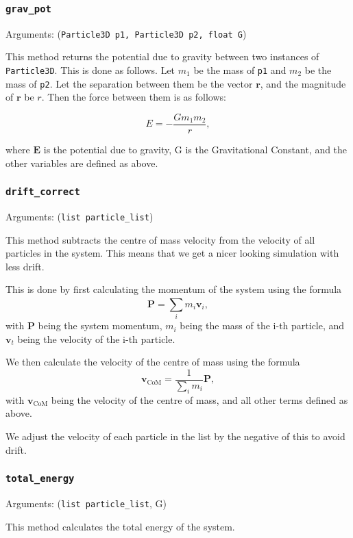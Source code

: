 \documentclass[a4paper, 11pt, british, left=1in, right=1in, top=0.3in, bottom=1in]{article}
\begin{document}
	\subsubsection{\texttt{grav\_pot}}
	
	Arguments: (\texttt{Particle3D p1, Particle3D p2, float G})
	
	This method returns the potential due to gravity between two instances of \texttt{Particle3D}. This is done as follows. Let $m_1$ be the mass of \texttt{p1} and $m_2$ be the mass of \texttt{p2}. Let the separation between them be the vector $\textbf{r}$, and the magnitude of $\textbf{r}$ be $r$. Then the force between them is as follows:
	
	$$E = -\frac{Gm_1m_2}{r},$$
	
	where $\textbf{E}$ is the potential due to gravity, G is the Gravitational Constant, and the other variables are defined as above. 
	
	\subsubsection{\texttt{drift\_correct}}
	
	Arguments: (\texttt{list particle\_list})
	
	This method subtracts the centre of mass velocity from the velocity of all particles in the system. This means that we get a nicer looking simulation with less drift. 
	
	This is done by first calculating the momentum of the system using the formula $$\textbf{P} = \sum_{i}^{}m_i\textbf{v}_i, $$ with $\textbf{P}$ being the system momentum, $m_i$ being the mass of the i-th particle, and $\textbf{v}_t$ being the velocity of the i-th particle. 
	
	We then calculate the velocity of the centre of mass using the formula $$\textbf{v}_{\text{CoM}} = \frac{1}{\sum_{i}^{}m_i}\textbf{P},$$ with $\textbf{v}_{\text{CoM}}$ being the velocity of the centre of mass, and all other terms defined as above. 
	
	We adjust the velocity of each particle in the list by the negative of this to avoid drift. 
	
	\subsubsection{\texttt{total\_energy}}
	
	Arguments: (\texttt{list particle\_list}, G)
	
	This method calculates the total energy of the system. 
	
\end{document}
